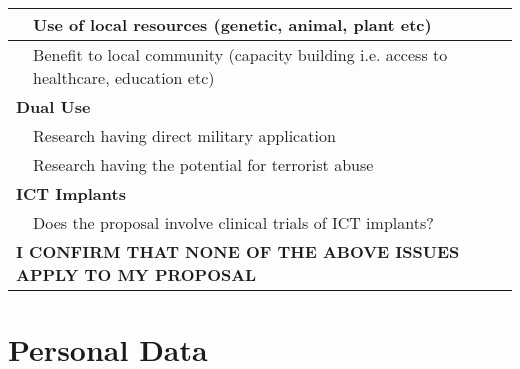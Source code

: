 \begin{small}
\begin{tabular}{|p{1em}p{11cm}|l|l|}
  & Use of local resources (genetic, animal, plant etc) & & \\\hline 
  & Benefit to local community (capacity building 
         i.e. access to healthcare, education etc) & & \\\hline 
  \multicolumn{2}{|l|}{\bf{Dual Use}} & & \\\hline 
  & Research having direct military application  & & \\\hline 
  & Research having the potential for terrorist abuse & & \\\hline 
  \multicolumn{2}{|l|}{\bf{ICT Implants}} & & \\\hline 
  & Does the proposal involve clinical trials of ICT implants?  & & \\\hline 
  \multicolumn{2}{|l|}{\bf\footnotesize{I CONFIRM THAT NONE OF THE ABOVE ISSUES APPLY TO MY PROPOSAL}} 
      & &\cellcolor{lightgray}{} \\\hline 
\end{tabular}
\end{small}

\section{Personal Data}
